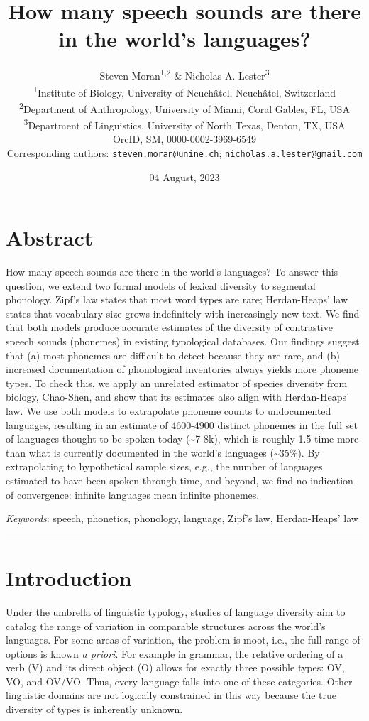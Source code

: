 \documentclass[
]{article}
\title{How many speech sounds are there in the world's languages?}
\author{Steven Moran\textsuperscript{1,2} \& Nicholas A.
Lester\textsuperscript{3}\\
\textsuperscript{1}Institute of Biology, University of Neuchâtel,
Neuchâtel, Switzerland\\
\textsuperscript{2}Department of Anthropology, University of Miami,
Coral Gables, FL, USA\\
\textsuperscript{3}Department of Linguistics, University of North Texas,
Denton, TX, USA\\
OrcID, SM, 0000-0002-3969-6549\\
Corresponding authors:
\href{mailto:steven.moran@unine.ch}{\nolinkurl{steven.moran@unine.ch}};
\href{mailto:nicholas.a.lester@gmail.com}{\nolinkurl{nicholas.a.lester@gmail.com}}}
\date{04 August, 2023}
\begin{document}
\maketitle

\hypertarget{abstract}{%
\section*{Abstract}\label{abstract}}

How many speech sounds are there in the world's languages? To answer
this question, we extend two formal models of lexical diversity to
segmental phonology. Zipf's law states that most word types are rare;
Herdan-Heaps' law states that vocabulary size grows indefinitely with
increasingly new text. We find that both models produce accurate
estimates of the diversity of contrastive speech sounds (phonemes) in
existing typological databases. Our findings suggest that (a) most
phonemes are difficult to detect because they are rare, and (b)
increased documentation of phonological inventories always yields more
phoneme types. To check this, we apply an unrelated estimator of species
diversity from biology, Chao-Shen, and show that its estimates also
align with Herdan-Heaps' law. We use both models to extrapolate phoneme
counts to undocumented languages, resulting in an estimate of 4600-4900
distinct phonemes in the full set of languages thought to be spoken
today (\textasciitilde7-8k), which is roughly 1.5 time more than what is
currently documented in the world's languages (\textasciitilde35\%). By
extrapolating to hypothetical sample sizes, e.g., the number of
languages estimated to have been spoken through time, and beyond, we
find no indication of convergence: infinite languages mean infinite
phonemes.

\emph{Keywords}: speech, phonetics, phonology, language, Zipf's law,
Herdan-Heaps' law

\begin{center}\rule{0.5\linewidth}{0.5pt}\end{center}

\hypertarget{introduction}{%
\section{Introduction}\label{introduction}}

Under the umbrella of linguistic typology, studies of language diversity
aim to catalog the range of variation in comparable structures across
the world's languages. For some areas of variation, the problem is moot,
i.e., the full range of options is known \emph{a priori}. For example in
grammar, the relative ordering of a verb (V) and its direct object (O)
allows for exactly three possible types: OV, VO, and OV/VO. Thus, every
language falls into one of these categories. Other linguistic domains
are not logically constrained in this way because the true diversity of
types is inherently unknown.
\end{document}
